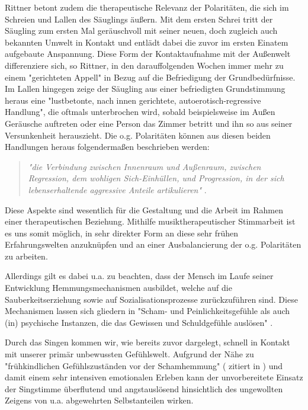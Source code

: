 Rittner \autocite [vgl.][106f.]{rittner1990} betont zudem die therapeutische Relevanz der Polaritäten, die sich im Schreien und Lallen des Säuglings äußern. Mit dem ersten Schrei tritt der Säugling zum ersten Mal geräuschvoll mit seiner neuen, doch zugleich auch bekannten Umwelt in Kontakt und entlädt dabei die zuvor im ersten Einatem aufgebaute Anspannung. Diese Form der Kontaktaufnahme mit der Außenwelt differenziere sich, so Rittner, in den darauffolgenden Wochen immer mehr zu einem "gerichteten Appell" in Bezug auf die Befriedigung der Grundbedürfnisse. Im Lallen hingegen zeige der Säugling aus einer befriedigten Grundstimmung heraus eine "lustbetonte, nach innen gerichtete, autoerotisch-regressive Handlung", die oftmals unterbrochen wird, sobald beispielsweise im Außen Geräusche auftreten oder eine Person das Zimmer betritt und ihn so aus seiner Versunkenheit herauszieht. 
Die o.g. Polaritäten können aus diesen beiden Handlungen heraus folgendermaßen beschrieben werden: 

\begin{quote}
\emph{"die Verbindung zwischen Innenraum und Außenraum, zwischen Regression, dem wohligen Sich-Einhüllen, und Progression, in der sich lebenserhaltende aggressive Anteile artikulieren"} \autocite[106f.]{rittner1990}. 
\end{quote}

Diese Aspekte sind wesentlich für die Gestaltung und die Arbeit im Rahmen einer therapeutischen Beziehung. Mithilfe musiktherapeutischer Stimmarbeit ist es uns somit möglich, in sehr direkter Form an diese sehr frühen Erfahrungswelten anzuknüpfen und an einer Ausbalancierung der o.g. Polaritäten zu arbeiten. 

Allerdings gilt es dabei u.a. zu beachten, dass der Mensch im Laufe seiner Entwicklung Hemmungsmechanismen ausbildet, welche auf die Sauberkeitserziehung sowie auf Sozialisationsprozesse zurückzuführen sind. Diese Mechanismen lassen sich gliedern in "Scham- und Peinlichkeitsgefühle als auch (in) psychische Instanzen, die das Gewissen und Schuldgefühle auslösen" \autocite [106f.]{rittner1990}. 

Durch das Singen kommen wir, wie bereits zuvor dargelegt, schnell in Kontakt mit unserer primär unbewussten Gefühlswelt. Aufgrund der Nähe zu "frühkindlichen Gefühlszuständen vor der Schamhemmung" (\cite{klausmeier1978} zitiert in \cite[107]{rittner1990}) und damit einem sehr intensiven emotionalen Erleben kann der unvorbereitete Einsatz der Singstimme überflutend und angstauslösend hinsichtlich des ungewollten Zeigens von u.a. abgewehrten Selbstanteilen wirken. 

